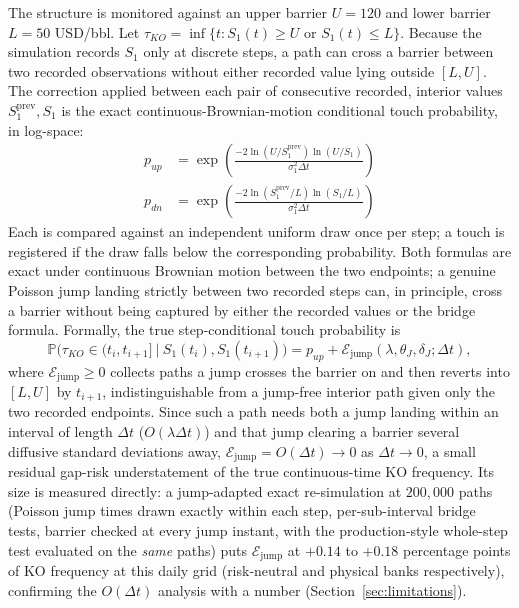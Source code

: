 \documentclass[11pt,a4paper]{article}
\begin{document}
The structure is monitored against an upper barrier $U=120$ and lower barrier $L=50$ USD/bbl. Let $\tau_{KO}=\inf\{t: S_1(t)\ge U \text{ or } S_1(t)\le L\}$. Because the simulation records $S_1$ only at discrete steps, a path can cross a barrier between two recorded observations without either recorded value lying outside $[L,U]$. The correction applied between each pair of consecutive recorded, interior values $S_1^{\mathrm{prev}},S_1$ is the exact continuous-Brownian-motion conditional touch probability, in log-space:
\begin{align}
p_{up} &= \exp\!\left(\frac{-2\ln(U/S_1^{\mathrm{prev}})\ln(U/S_1)}{\sigma_1^2\Delta t}\right) \\
p_{dn} &= \exp\!\left(\frac{-2\ln(S_1^{\mathrm{prev}}/L)\ln(S_1/L)}{\sigma_1^2\Delta t}\right)
\end{align}
Each is compared against an independent uniform draw once per step; a touch is registered if the draw falls below the corresponding probability. Both formulas are exact under continuous Brownian motion between the two endpoints; a genuine Poisson jump landing strictly between two recorded steps can, in principle, cross a barrier without being captured by either the recorded values or the bridge formula. Formally, the true step-conditional touch probability is
\begin{equation}
\label{eq:jumpgap}
\mathbb P\big(\tau_{KO}\in(t_i,t_{i+1}]\ \big|\ S_1(t_i),S_1(t_{i+1})\big) = p_{up} + \mathcal E_{\mathrm{jump}}(\lambda,\theta_J,\delta_J;\Delta t),
\end{equation}
where $\mathcal E_{\mathrm{jump}}\ge0$ collects paths a jump crosses the barrier on and then reverts into $[L,U]$ by $t_{i+1}$, indistinguishable from a jump-free interior path given only the two recorded endpoints. Since such a path needs both a jump landing within an interval of length $\Delta t$ ($O(\lambda\Delta t)$) and that jump clearing a barrier several diffusive standard deviations away, $\mathcal E_{\mathrm{jump}}=O(\Delta t)\to0$ as $\Delta t\to0$, a small residual gap-risk understatement of the true continuous-time KO frequency. Its size is measured directly: a jump-adapted exact re-simulation at $200{,}000$ paths (Poisson jump times drawn exactly within each step, per-sub-interval bridge tests, barrier checked at every jump instant, with the production-style whole-step test evaluated on the \emph{same} paths) puts $\mathcal E_{\mathrm{jump}}$ at $+0.14$ to $+0.18$ percentage points of KO frequency at this daily grid (risk-neutral and physical banks respectively), confirming the $O(\Delta t)$ analysis with a number (Section~\ref{sec:limitations}).
\end{document}
